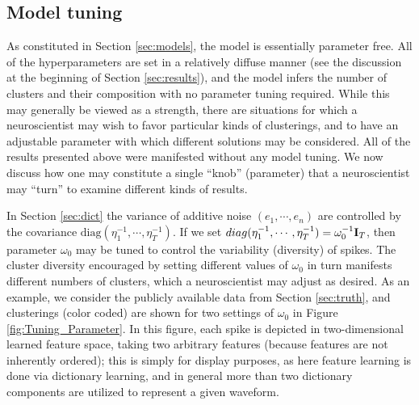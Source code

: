 \documentclass[journal]{IEEEtran}
\begin{document}
\subsection{Model tuning}

As constituted in Section \ref{sec:models}, the model is essentially parameter free. All of the hyperparameters are set in a relatively diffuse manner (see the discussion at the beginning of Section \ref{sec:results}), and the model infers the number of clusters and their composition with no parameter tuning required. While this may generally be viewed as a strength, there are situations for which a neuroscientist may wish to favor particular kinds of clusterings, and to have an adjustable parameter with which different solutions may be considered. All of the results presented above were manifested without any model tuning. We now discuss how one may constitute a single ``knob'' (parameter) that a neuroscientist may ``turn'' to examine different kinds of results.


In Section \ref{sec:dict} the variance of additive noise $(e_1,\cdots, e_n)$ are controlled by the covariance $\mbox{diag}(\eta_1^{-1},\cdots, \eta_T^{-1})$. If we set $\relax{diag}(\eta_1^{-1},\cdots, \eta_T^{-1})=\omega_0^{-1}{\mathbf I}_T$, then parameter $\omega_0$ may be tuned to control the variability (diversity) of spikes. The cluster diversity encouraged by setting different values of $\omega_0$ in turn manifests different numbers of clusters, which a neuroscientist may adjust as desired. As an example, we consider the publicly available data from Section \ref{sec:truth}, and clusterings (color coded) are shown for two settings of $\omega_0$ {in } Figure \ref{fig:Tuning_Parameter}. In this figure{,} each spike is depicted in two-dimensional {learned feature} space, taking {two arbitrary features (because features are not inherently ordered)}; this is simply for display purposes, as here feature learning is done via dictionary learning, and in general more than two dictionary components are utilized to represent a given waveform.
\end{document}
